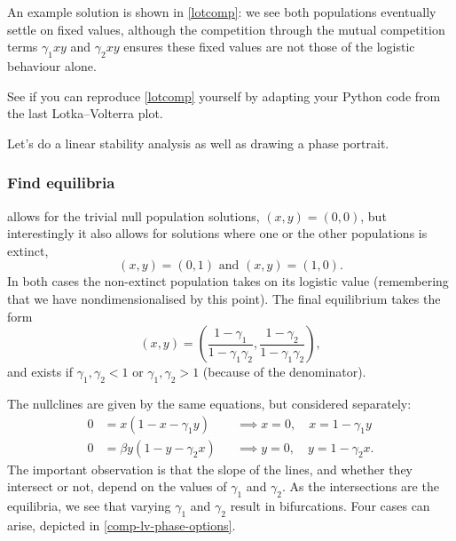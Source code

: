 \documentclass[main.tex]{subfiles}
\begin{document}
An example solution is shown in \cref{lotcomp}: we see both populations eventually settle on fixed values, although the competition through the mutual competition terms $\gamma_1 xy $ and $\gamma_2 x y$ ensures these fixed values are not those of the logistic behaviour alone.  

\begin{do-it-yourself}
See if you can reproduce \cref{lotcomp} yourself by adapting your Python code from the last Lotka--Volterra plot.
\end{do-it-yourself}

Let’s do a linear stability analysis as well as drawing a phase portrait.


\subsubsection*{\StepOne Find equilibria}
\label{chap4equilibria}
 allows for the trivial null population solutions, $(x,y)=(0,0)$, but interestingly it also allows for solutions where one or the other populations is extinct,
\begin{equation}
(x,y) = (0,1)\mbox{ and } (x,y) = (1,0).
\end{equation}
In both cases the non-extinct population takes on its logistic value (remembering that we have nondimensionalised by this point). The final equilibrium takes the form 
\begin{equation}
\label{nonzeroeq}
(x,y) = \left( \frac{1-\gamma_1}{1-\gamma_1\gamma_2}, \frac{1-\gamma_2}{1-\gamma_1\gamma_2} \right),
\end{equation}
and exists if $\gamma_1,\gamma_2<1$ or $\gamma_1,\gamma_2>1$ (because of the denominator).

The nullclines are given by the same equations, but considered separately:
\begin{subequations}
\begin{align}
0 &= x(1-x-\gamma_1y) &&\implies x=0, \quad x=1-\gamma_1 y\\
0 &= \beta y(1-y-\gamma_2x) &&\implies y=0, \quad y=1-\gamma_2 x.
\end{align}
\end{subequations}
The important observation is that the slope of the lines, and whether they intersect or not, depend on the values of $\gamma_1$ and $\gamma_2$. As the intersections are the equilibria, we see that varying $\gamma_1$ and $\gamma_2$ result in bifurcations. Four cases can arise, depicted in \cref{comp-lv-phase-options}.
\end{document}
